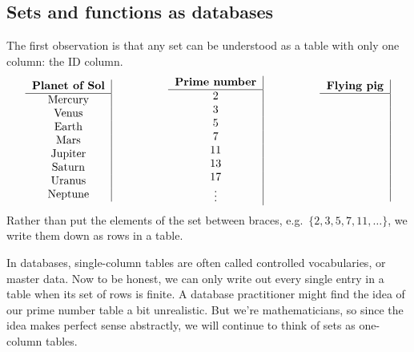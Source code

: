 \documentclass[7Sketches]{subfiles}
\begin{document}
\subsection{Sets and functions as databases}
%
%
%

The first observation is that any set can be understood as a table with only one column: the ID column.
\[
\begin{tabular}{ c |}
  \textbf{Planet of Sol}\\\hline
  Mercury\\
	Venus\\
	Earth\\
	Mars\\
	Jupiter\\
	Saturn\\
	Uranus\\
	Neptune
\end{tabular}
\hspace{.7in}
\begin{tabular}{ c |}
  \textbf{Prime number}\\\hline
  2\\
	3\\
	5\\
	7\\
	11\\
	13\\
	17\\
	$\vdots$
\end{tabular}
\hspace{.7in}
\begin{tabular}{ c |}
  \textbf{Flying pig}\\\hline
  ~\\
	~\\
	~\\
	~\\
	~\\
	~\\
	~\\
	~
\end{tabular}
\]
Rather than put the elements of the set between braces, e.g.\ $\{2,3,5,7,11,\ldots\}$, we write them down as rows in a table.

In databases, single-column tables are often called controlled vocabularies, or master data. Now to be honest, we can only write out every single entry in a table when its set of rows is finite. A database practitioner might find the idea of our prime number table a bit unrealistic. But we're mathematicians, so since the idea makes perfect sense abstractly, we will continue to think of sets as one-column tables.
\end{document}
